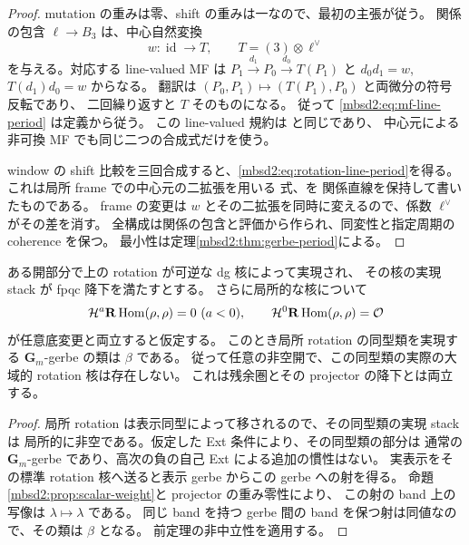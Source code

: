 \begin{proof}
mutation の重みは零、shift の重みは一なので、最初の主張が従う。
関係の包含 $\ell\to B_3$ は、中心自然変換
\[
 w:\operatorname{id}\longrightarrow T,
 \qquad T=(3)\otimes\ell^\vee
\]
を与える。対応する line-valued MF は
$P_1\xrightarrow{d_1}P_0\xrightarrow{d_0}T(P_1)$ と
$d_0d_1=w$, $T(d_1)d_0=w$ からなる。
翻訳は $(P_0,P_1)\mapsto(T(P_1),P_0)$ と両微分の符号反転であり、
二回繰り返すと $T$ そのものになる。
従って \eqref{mbsd2:eq:mf-line-period} は定義から従う。
この line-valued 規約は
\cite[Definitions~1.1, 1.3]{MBS2PolishchukVaintrob}と同じであり、
中心元による非可換 MF でも同じ二つの合成式だけを使う。

window の shift 比較を三回合成すると、\eqref{mbsd2:eq:rotation-line-period}を得る。
これは局所 frame での中心元の二拡張を用いる
式、を
関係直線を保持して書いたものである。
frame の変更は $w$ とその二拡張を同時に変えるので、係数 $\ell^\vee$ がその差を消す。
全構成は関係の包含と評価から作られ、同変性と指定周期の coherence を保つ。
最小性は定理\ref{mbsd2:thm:gerbe-period}による。
\end{proof}

\begin{corollary}
\label{mbsd2:cor:rotation-obstruction}
ある開部分で上の rotation が可逆な dg 核によって実現され、
その核の実現 stack が fpqc 降下を満たすとする。
さらに局所的な核について
\[
 \mathcal H^a\mathbf R\operatorname{Hom}(\rho,\rho)=0\ (a<0),
 \qquad
 \mathcal H^0\mathbf R\operatorname{Hom}(\rho,\rho)=\mathcal O
\]
が任意底変更と両立すると仮定する。
このとき局所 rotation の同型類を実現する $\mathbf G_m$-gerbe の類は $\beta$ である。
従って任意の非空開で、この同型類の実際の大域的 rotation 核は存在しない。
これは残余圏とその projector の降下とは両立する。
\end{corollary}

\begin{proof}
局所 rotation は表示同型によって移されるので、その同型類の実現 stack は
局所的に非空である。仮定した Ext 条件により、その同型類の部分は
通常の $\mathbf G_m$-gerbe であり、高次の負の自己 Ext による追加の慣性はない。
実表示をその標準 rotation 核へ送ると表示 gerbe からこの gerbe への射を得る。
命題\ref{mbsd2:prop:scalar-weight}と projector の重み零性により、
この射の band 上の写像は $\lambda\mapsto\lambda$ である。
同じ band を持つ gerbe 間の band を保つ射は同値なので、その類は $\beta$ となる。
前定理の非中立性を適用する。
\end{proof}

